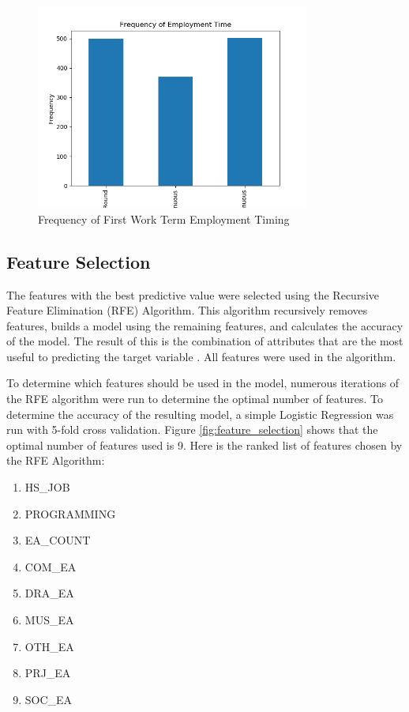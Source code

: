\documentclass{article}
\begin{document}
\begin{figure}[h]
\includegraphics[width=9cm]{images/timing.png}
\caption{Frequency of First Work Term Employment Timing}\label{fig:timing}
\centering
\end{figure}


\subsection{Feature Selection}
The features with the best predictive value were selected using the Recursive Feature Elimination (RFE) Algorithm. This algorithm recursively removes features, builds a model using the remaining features, and calculates the accuracy of the model. The result of this is the combination of attributes that are the most useful to predicting the target variable \cite{hg:11}. All features were used in the algorithm. 

To determine which features should be used in the model, numerous iterations of the RFE algorithm were run to determine the optimal number of features. To determine the accuracy of the resulting model, a simple Logistic Regression was run with 5-fold cross validation. Figure \ref{fig:feature_selection} shows that the optimal number of features used is 9. Here is the ranked list of features chosen by the RFE Algorithm: 
\begin{enumerate}
	\item HS\_JOB
	\item PROGRAMMING
	\item EA\_COUNT
	\item COM\_EA
	\item DRA\_EA
	\item MUS\_EA
	\item OTH\_EA
	\item PRJ\_EA
	\item SOC\_EA
\end{enumerate}
\end{document}
